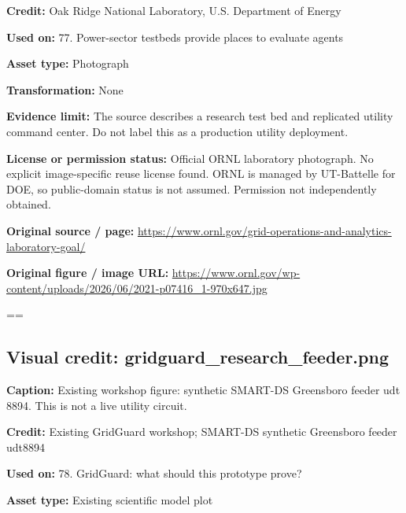 \documentclass[10pt,letterpaper]{article}
\begin{document}
\textbf{Credit:} Oak Ridge National Laboratory, U.S. Department of Energy\par
\textbf{Used on:} 77. Power-sector testbeds provide places to evaluate agents\par
\textbf{Asset type:} Photograph\par
\textbf{Transformation:} None\par
\textbf{Evidence limit:} The source describes a research test bed and replicated utility command center. Do not label this as a production utility deployment.\par
\textbf{License or permission status:} Official ORNL laboratory photograph. No explicit image-specific reuse license found. ORNL is managed by UT-Battelle for DOE, so public-domain status is not assumed. Permission not independently obtained.\par
\textbf{Original source / page:} \href{https://www.ornl.gov/grid-operations-and-analytics-laboratory-goal/}{\small\ttfamily https:/\allowbreak{}/\allowbreak{}www.\allowbreak{}ornl.\allowbreak{}gov/\allowbreak{}grid-\allowbreak{}operations-\allowbreak{}and-\allowbreak{}analytics-\allowbreak{}laboratory-\allowbreak{}goal/\allowbreak{}}\par
\textbf{Original figure / image URL:} \href{https://www.ornl.gov/wp-content/uploads/2026/06/2021-p07416_1-970x647.jpg}{\small\ttfamily https:/\allowbreak{}/\allowbreak{}www.\allowbreak{}ornl.\allowbreak{}gov/\allowbreak{}wp-\allowbreak{}content/\allowbreak{}uploads/\allowbreak{}2026/\allowbreak{}06/\allowbreak{}2021-\allowbreak{}p07416\_\allowbreak{}1-\allowbreak{}970x647.\allowbreak{}jpg}\par
\egroup\par\noindent\box\readingEntry\par\medskip
\setbox\readingEntry=\vbox\bgroup\hsize=\linewidth\subsection*{Visual credit: gridguard\_research\_feeder.png}
\textbf{Caption:} Existing workshop figure: synthetic SMART-DS Greensboro feeder udt 8894. This is not a live utility circuit.\par
\textbf{Credit:} Existing GridGuard workshop; SMART-DS synthetic Greensboro feeder udt8894\par
\textbf{Used on:} 78. GridGuard: what should this prototype prove?\par
\textbf{Asset type:} Existing scientific model plot\par
\end{document}
